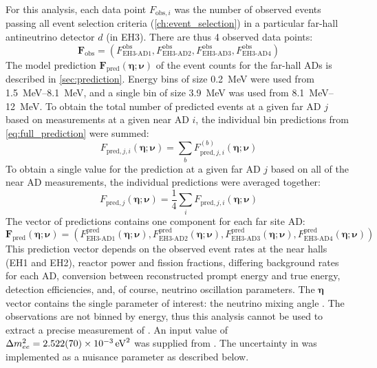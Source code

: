 For this analysis, each data point $F_{\text{obs},i}$
was the number of observed events passing all event selection criteria
(\cref{ch:event_selection})
in a particular far-hall antineutrino detector $d$ (in EH3).
There are thus 4 observed data points:
\begin{equation}
    \mathbf{F}_{\text{obs}} =
    (F^{\text{obs}}_{\text{EH3-AD1}},
    F^{\text{obs}}_{\text{EH3-AD2}},
    F^{\text{obs}}_{\text{EH3-AD3}},
    F^{\text{obs}}_{\text{EH3-AD4}})
\end{equation}
The model prediction
$\mathbf{F}_{\text{pred}}(\boldsymbol{\eta};\boldsymbol{\nu})$
of the event counts for the far-hall ADs
is described in \cref{sec:prediction}.
Energy bins of size \SI{0.2}{\MeV} were used from \SIrange{1.5}{8.1}{\MeV},
and a single bin of size \SI{3.9}{\MeV} was used from \SIrange{8.1}{12}{\MeV}.
To obtain the total number of predicted events at a given far AD $j$
based on measurements at a given near AD $i$,
the individual bin predictions from \cref{eq:full_prediction} were summed:
\begin{equation}\label{eq:hybrid_rate_shape}
    F_{\text{pred},j,i}(\boldsymbol{\eta};\boldsymbol{\nu}) =
    \sum_b F_{\text{pred},j,i}^{(b)}(\boldsymbol{\eta};\boldsymbol{\nu})
\end{equation}
To obtain a single value for the prediction at a given far AD $j$
based on all of the near AD measurements,
the individual predictions were averaged together:
\begin{equation}\label{eq:average_near}
    F_{\text{pred},j}(\boldsymbol{\eta};\boldsymbol{\nu}) =
    \frac{1}{4} \sum_i
    F_{\text{pred},j,i}(\boldsymbol{\eta};\boldsymbol{\nu})
\end{equation}
The vector of predictions contains one component for each far site AD:
\begin{equation}\label{eq:f_pred_vector}
    \mathbf{F}_\text{pred}(\boldsymbol{\eta};\boldsymbol{\nu}) =
    (
    F^{\text{pred}}_{\text{EH3-AD1}}(\boldsymbol{\eta};\boldsymbol{\nu}),
    F^{\text{pred}}_{\text{EH3-AD2}}(\boldsymbol{\eta};\boldsymbol{\nu}),
    F^{\text{pred}}_{\text{EH3-AD3}}(\boldsymbol{\eta};\boldsymbol{\nu}),
    F^{\text{pred}}_{\text{EH3-AD4}}(\boldsymbol{\eta};\boldsymbol{\nu})
    )
\end{equation}
This prediction vector depends on the observed event rates at the near halls (EH1 and EH2),
reactor power and fission fractions,
differing background rates for each AD,
conversion between reconstructed prompt energy and true \nuebar{} energy,
detection efficiencies,
and, of course, neutrino oscillation parameters.
The $\boldsymbol{\eta}$ vector contains the single parameter of interest:
the neutrino mixing angle \thetaot{}.
The observations are not binned by energy,
thus this analysis cannot be used to extract
a precise measurement of \dmee{}.
An input value of $\dmee = \SI{2.522(70)e-3}{\eV\squared}$
was supplied from \cite{ngd2018}.
The uncertainty in \dmee{} was implemented
as a nuisance parameter as described below.

